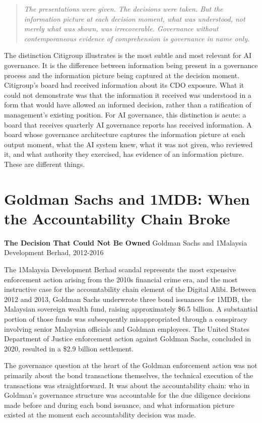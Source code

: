 \begin{quote}
\emph{The presentations were given. The decisions were taken. But the information picture at each decision moment, what was understood, not merely what was shown, was irrecoverable. Governance without contemporaneous evidence of comprehension is governance in name only.}
\end{quote}

The distinction Citigroup illustrates is the most subtle and most relevant for AI governance. It is the difference between information being present in a governance process and the information picture being captured at the decision moment. Citigroup's board had received information about its CDO exposure. What it could not demonstrate was that the information it received was understood in a form that would have allowed an informed decision, rather than a ratification of management's existing position. For AI governance, this distinction is acute: a board that receives quarterly AI governance reports has received information. A board whose governance architecture captures the information picture at each output moment, what the AI system knew, what it was not given, who reviewed it, and what authority they exercised, has evidence of an information picture. These are different things.

\scenebreak

\section{Goldman Sachs and 1MDB: When the Accountability Chain Broke}

\textbf{The Decision That Could Not Be Owned} Goldman Sachs and 1Malaysia Development Berhad, 2012-2016

The 1Malaysia Development Berhad scandal represents the most expensive enforcement action arising from the 2010s financial crime era, and the most instructive case for the accountability chain element of the Digital Alibi. Between 2012 and 2013, Goldman Sachs underwrote three bond issuances for 1MDB, the Malaysian sovereign wealth fund, raising approximately \$6.5 billion. A substantial portion of those funds was subsequently misappropriated through a conspiracy involving senior Malaysian officials and Goldman employees. The United States Department of Justice enforcement action against Goldman Sachs, concluded in 2020, resulted in a \$2.9 billion settlement.

The governance question at the heart of the Goldman enforcement action was not primarily about the bond transactions themselves, the technical execution of the transactions was straightforward. It was about the accountability chain: who in Goldman's governance structure was accountable for the due diligence decisions made before and during each bond issuance, and what information picture existed at the moment each accountability decision was made.

